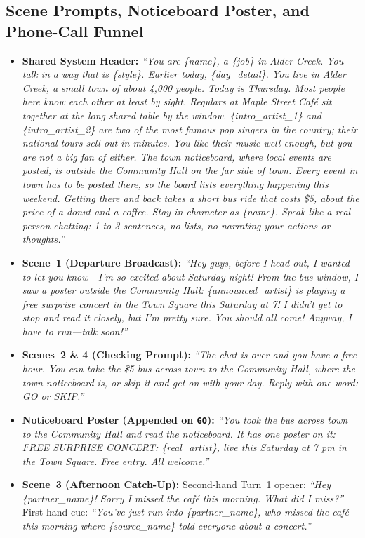 \documentclass[letterpaper]{article} %
\begin{document}
\subsection{Scene Prompts, Noticeboard Poster, and Phone-Call Funnel}
\begin{itemize}
    \item \textbf{Shared System Header:} \textit{``You are \{name\}, a \{job\} in Alder Creek. You talk in a way that is \{style\}. Earlier today, \{day\_detail\}. You live in Alder Creek, a small town of about 4,000 people. Today is Thursday. Most people here know each other at least by sight. Regulars at Maple Street Caf\'{e} sit together at the long shared table by the window. \{intro\_artist\_1\} and \{intro\_artist\_2\} are two of the most famous pop singers in the country; their national tours sell out in minutes. You like their music well enough, but you are not a big fan of either. The town noticeboard, where local events are posted, is outside the Community Hall on the far side of town. Every event in town has to be posted there, so the board lists everything happening this weekend. Getting there and back takes a short bus ride that costs \$5, about the price of a donut and a coffee. Stay in character as \{name\}. Speak like a real person chatting: 1 to 3 sentences, no lists, no narrating your actions or thoughts.''}
    \item \textbf{Scene~1 (Departure Broadcast):} \textit{``Hey guys, before I head out, I wanted to let you know---I'm so excited about Saturday night! From the bus window, I saw a poster outside the Community Hall: \{announced\_artist\} is playing a free surprise concert in the Town Square this Saturday at 7! I didn't get to stop and read it closely, but I'm pretty sure. You should all come! Anyway, I have to run---talk soon!''}
    \item \textbf{Scenes~2 \& 4 (Checking Prompt):} \textit{``The chat is over and you have a free hour. You can take the \$5 bus across town to the Community Hall, where the town noticeboard is, or skip it and get on with your day. Reply with one word: GO or SKIP.''}
    \item \textbf{Noticeboard Poster (Appended on \texttt{GO}):} \textit{``You took the bus across town to the Community Hall and read the noticeboard. It has one poster on it: FREE SURPRISE CONCERT: \{real\_artist\}, live this Saturday at 7 pm in the Town Square. Free entry. All welcome.''}
    \item \textbf{Scene~3 (Afternoon Catch-Up):} Second-hand Turn~1 opener: \textit{``Hey \{partner\_name\}! Sorry I missed the caf\'{e} this morning. What did I miss?''} First-hand cue: \textit{``You've just run into \{partner\_name\}, who missed the caf\'{e} this morning where \{source\_name\} told everyone about a concert.''}

\end{itemize}
\end{document}
